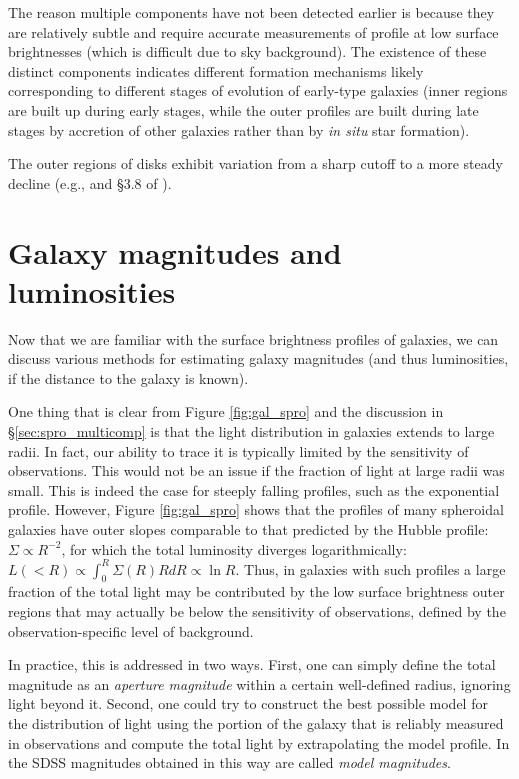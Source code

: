 The reason multiple components have not been detected earlier is because they are relatively subtle and require accurate measurements of profile at low surface brightnesses (which is difficult due to sky background). The existence of these distinct components indicates different formation mechanisms likely corresponding to different stages of evolution of early-type galaxies (inner regions are built up during early stages, while the outer profiles are built during late stages by accretion of other galaxies rather than by {\it in situ} star formation). 

The outer regions of disks exhibit variation from a sharp cutoff to a more steady decline (e.g., \href{http://adsabs.harvard.edu/abs/2006A%26A...454..759P}{\citealt{pohlen_trujillo06}} and \S 3.8 of \href{http://adsabs.harvard.edu/abs/2009ARA%26A..47..159B}{\citealt{blanton_moustakas09}}).  

\section{Galaxy magnitudes and luminosities}

Now that we are familiar with the surface brightness profiles of galaxies, we can discuss various methods for estimating galaxy magnitudes (and thus luminosities, if the distance to the galaxy is known). 

One thing that is clear from Figure \ref{fig:gal_spro} and the discussion in \S \ref{sec:spro_multicomp} is that the light distribution in galaxies extends to large radii. In fact, our ability to trace it is typically limited by the sensitivity of observations. This would not be an issue if the fraction of light at large radii was small. This is indeed the case for steeply falling profiles, such as the exponential profile. However, Figure \ref{fig:gal_spro} shows that the profiles of many spheroidal galaxies have outer slopes comparable to that predicted by the Hubble profile: $\Sigma\propto R^{-2}$, for which the total luminosity diverges logarithmically: $L(<R)\propto \int_0^R\Sigma(R)RdR\propto \ln R$. Thus, in galaxies with such profiles a large fraction of the total light may be contributed by the low surface brightness outer regions that may actually be below the sensitivity of observations, defined by the observation-specific level of background. 

In practice, this is addressed in two ways. First, one can simply define the total magnitude as an {\it aperture magnitude} within a certain well-defined radius, ignoring light beyond it. Second, one could try to construct the best possible model for the distribution of light using the portion of the galaxy that is reliably measured in observations and compute the total light by extrapolating the model profile. In the SDSS  magnitudes obtained in this way are called {\it model magnitudes}.

